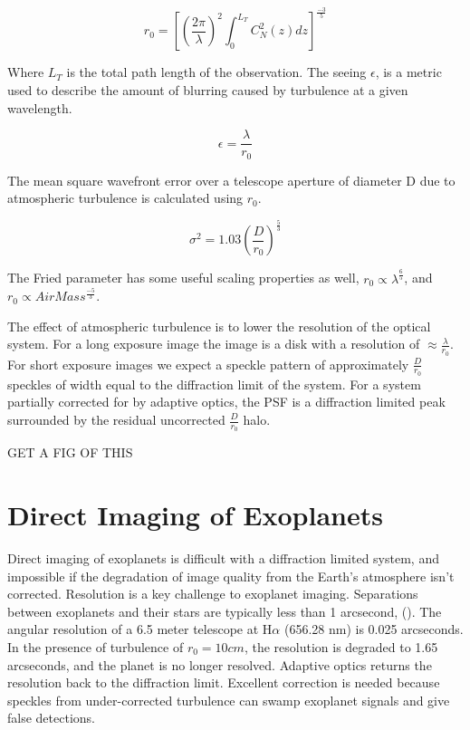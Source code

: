 \begin{equation}
    r_0=[(\frac{2\pi}{\lambda})^2 \int_0^{L_T} C_N^2(z)dz]^{\frac{-3}{5}}
\end{equation}
 
 Where $L_T$ is the total path length of the observation. The seeing $\epsilon$, is a metric used to describe the amount of blurring caused by turbulence at a given wavelength.
 
 \begin{equation}
     \epsilon=\frac{\lambda}{r_0}
 \end{equation}
 
 The mean square wavefront error over a telescope aperture of diameter D due to atmospheric turbulence is calculated using $r_0$.
 
 \begin{equation}
     \sigma^2=1.03(\frac{D}{r_0})^{\frac{5}{3}}
 \end{equation}

The Fried parameter has some useful scaling properties as well, $r_0 \propto \lambda^{\frac{6}{5}}$, and $r_0 \propto AirMass^{\frac{-5}{3}}$.

The effect of atmospheric turbulence is to lower the resolution of the optical system. For a long exposure image the image is a disk with a resolution of $\approx \frac{\lambda}{r_0 }$. For short exposure images we expect a speckle pattern of approximately $\frac{D}{r_0}$ speckles of width equal to the diffraction limit of the system. For a system partially corrected for by adaptive optics, the PSF is a diffraction limited peak surrounded by the residual uncorrected $\frac{D}{r_0}$ halo.


GET A FIG OF THIS


\section{Direct Imaging of Exoplanets}

Direct imaging of exoplanets is difficult with a diffraction limited system, and impossible if the degradation of image quality from the Earth's atmosphere isn't corrected. Resolution is a key challenge to exoplanet imaging. Separations between exoplanets and their stars are typically less than 1 arcsecond, (\cite{kane2018maximum}). The angular resolution of a 6.5 meter telescope at H$\alpha$ (656.28 nm) is 0.025 arcseconds. In the presence of turbulence of $r_0=10cm$, the resolution is degraded to 1.65 arcseconds, and the planet is no longer resolved. Adaptive optics returns the resolution back to the diffraction limit. Excellent correction is needed because speckles from under-corrected turbulence can swamp exoplanet signals and give false detections. 

